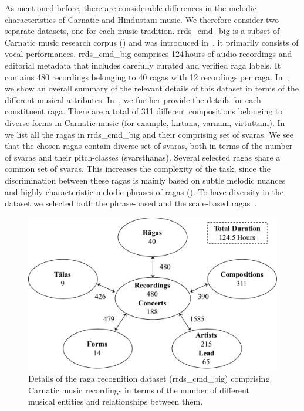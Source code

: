 {{{{ As mentioned before, there are considerable differences in the melodic characteristics of Carnatic and Hindustani music. We therefore consider two separate datasets, one for each music tradition. \acrshort{rrds_cmd_big} is a subset of Carnatic music research corpus () and was introduced in~\cite{gulatiphrase_2016}. it primarily consists of vocal performances. \acrshort{rrds_cmd_big} comprises 124\,hours of audio recordings and editorial metadata that includes carefully curated and verified \gls{raga} labels. It contains 480 recordings belonging to 40 \glspl{raga} with 12 recordings per \gls{raga}. In~, we show an overall summary of the relevant details of this dataset in terms of the different musical attributes. In~, we further provide the details for each constituent \gls{raga}. There are a total of 311 different compositions belonging to diverse forms in Carnatic music (for example, k\={i}rtana, varnam, virtuttam). In~ we list all the \glspl{raga} in \acrshort{rrds_cmd_big} and their comprising set of \glspl{svara}. We see that the chosen \glspl{raga} contain diverse set of \glspl{svara}, both in terms of the number of \glspl{svara} and their pitch-classes (\glspl{svarsthana}). Several selected \glspl{raga} share a common set of \glspl{svara}. This increases the complexity of the task, since the discrimination between these \glspl{raga} is mainly based on subtle melodic nuances and highly characteristic melodic phrases of \glspl{raga} (). To have diversity in the dataset we selected both the phrase-based and the scale-based \glspl{raga}~\citep{krishna2012carnatic,meer1980hindustani}.

 \begin{figure}
 	\begin{center}
 		\includegraphics[width=\figSizeNinety]{ch04_datasets/figures/carnatic_corpus_ragaDB.pdf}
 	\end{center}
 	\caption[Details of the \gls{raga} recognition dataset comprising Carnatic music recordings]{Details of the \gls{raga} recognition dataset (\acrshort{rrds_cmd_big}) comprising Carnatic music recordings in terms of the number of different musical entities and relationships between them.}
 	\label{fig:carnatic_ragaDB_details}
 \end{figure}

}}}}
